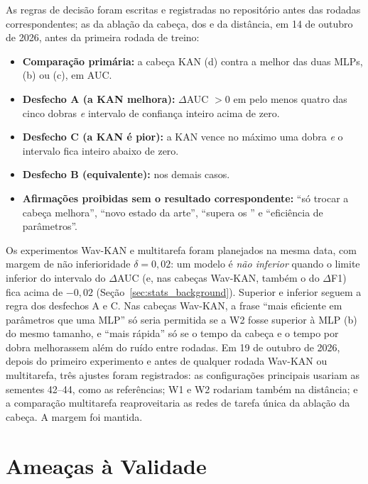 As regras de decisão foram escritas e registradas no repositório antes das rodadas correspondentes; as da ablação da cabeça, dos  e da distância, em 14 de outubro de 2026, antes da primeira rodada de treino:
\begin{itemize}
    \item \textbf{Comparação primária:} a cabeça KAN (d) contra a melhor das duas MLPs, (b) ou (c), em AUC.
    \item \textbf{Desfecho A (a KAN melhora):} $\Delta$AUC $> 0$ em pelo menos quatro das cinco dobras \emph{e} intervalo de confiança inteiro acima de zero.
    \item \textbf{Desfecho C (a KAN é pior):} a KAN vence no máximo uma dobra \emph{e} o intervalo fica inteiro abaixo de zero.
    \item \textbf{Desfecho B (equivalente):} nos demais casos.
    \item \textbf{Afirmações proibidas sem o resultado correspondente:} ``só trocar a cabeça melhora'', ``novo estado da arte'', ``supera os '' e ``eficiência de parâmetros''.
\end{itemize}

Os experimentos Wav-KAN e multitarefa foram planejados na mesma data, com margem de não inferioridade $\delta = 0{,}02$: um modelo é \emph{não inferior} quando o limite inferior do intervalo do $\Delta$AUC (e, nas cabeças Wav-KAN, também o do $\Delta$F1) fica acima de $-0{,}02$ (Seção~\ref{sec:stats_background}). Superior e inferior seguem a regra dos desfechos A e C. Nas cabeças Wav-KAN, a frase ``mais eficiente em parâmetros que uma MLP'' só seria permitida se a W2 fosse superior à MLP (b) do mesmo tamanho, e ``mais rápida'' só se o tempo da cabeça e o tempo por dobra melhorassem além do ruído entre rodadas. Em 19 de outubro de 2026, depois do primeiro experimento e antes de qualquer rodada Wav-KAN ou multitarefa, três ajustes foram registrados: as configurações principais usariam as sementes 42--44, como as referências; W1 e W2 rodariam também na distância; e a comparação multitarefa reaproveitaria as redes de tarefa única da ablação da cabeça. A margem foi mantida.

\section{Ameaças à Validade}
\label{sec:threats}

